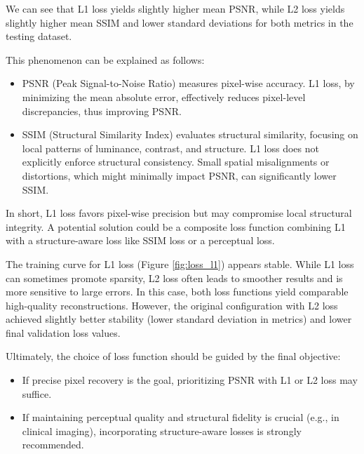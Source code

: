 \documentclass{article}
\begin{document}
We can see that L1 loss yields slightly higher mean PSNR, while L2 loss yields slightly higher mean SSIM and lower standard deviations for both metrics in the testing dataset.

This phenomenon can be explained as follows:
\begin{itemize}
  \item PSNR (Peak Signal-to-Noise Ratio) measures pixel-wise accuracy. L1 loss, by minimizing the mean absolute error, effectively reduces pixel-level discrepancies, thus improving PSNR.
  \item SSIM (Structural Similarity Index) evaluates structural similarity, focusing on local patterns of luminance, contrast, and structure. L1 loss does not explicitly enforce structural consistency. Small spatial misalignments or distortions, which might minimally impact PSNR, can significantly lower SSIM.
\end{itemize}
In short, L1 loss favors pixel-wise precision but may compromise local structural integrity. A potential solution could be a composite loss function combining L1 with a structure-aware loss like SSIM loss or a perceptual loss.

The training curve for L1 loss (Figure \ref{fig:loss_l1}) appears stable. While L1 loss can sometimes promote sparsity, L2 loss often leads to smoother results and is more sensitive to large errors. In this case, both loss functions yield comparable high-quality reconstructions. However, the original configuration with L2 loss achieved slightly better stability (lower standard deviation in metrics) and lower final validation loss values.

Ultimately, the choice of loss function should be guided by the final objective:
\begin{itemize}
  \item If precise pixel recovery is the goal, prioritizing PSNR with L1 or L2 loss may suffice.
  \item If maintaining perceptual quality and structural fidelity is crucial (e.g., in clinical imaging), incorporating structure-aware losses is strongly recommended.
\end{itemize}
\end{document}
